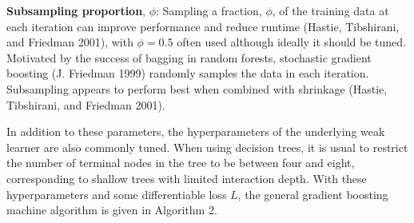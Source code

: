 \documentclass[
  letterpaper,
  krantz2]{style/krantz}
\begin{document}
\textbf{Subsampling proportion},
\(\phi\):
Sampling a fraction, \(\phi\), of the training data at each iteration
can improve performance and reduce runtime (Hastie, Tibshirani, and
Friedman 2001), with \(\phi = 0.5\) often used although ideally it
should be tuned. Motivated by the success of bagging in random forests,
stochastic gradient boosting (J. Friedman 1999) randomly samples the
data in each iteration. Subsampling appears to perform best when
combined with shrinkage (Hastie, Tibshirani, and Friedman 2001).

In addition to these parameters, the hyperparameters of the underlying
weak learner are also commonly tuned. When using decision trees, it is
usual to restrict the number of terminal nodes in the tree to be between
four and eight, corresponding to shallow trees with limited interaction
depth. With these hyperparameters and some
differentiable loss \(L\), the general gradient boosting machine
algorithm is given in Algorithm 2.
\end{document}
